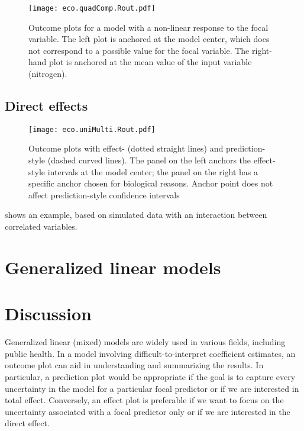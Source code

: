 \begin{figure}
\begin{center}
\texttt{[image: eco.quadComp.Rout.pdf]}
\end{center}
\caption{Outcome plots for a model with a non-linear response to the focal variable. The left plot is anchored at the model center, which does not correspond to a possible value for the focal variable. The right-hand plot is anchored at the mean value of the input variable (nitrogen). }
\end{figure}

\subsection{Direct effects}

\begin{figure}
\begin{center}
\texttt{[image: eco.uniMulti.Rout.pdf]}
\end{center}
\caption{Outcome plots with effect- (dotted straight lines) and prediction-style (dashed curved lines). The panel on the left anchors the effect-style intervals at the model center; the panel on the right has a specific anchor chosen for biological reasons. Anchor point does not affect prediction-style confidence intervals}
\end{figure}

 shows an example, based on simulated data with an interaction between correlated variables.

\section{Generalized linear models}

\section{Discussion}

Generalized linear (mixed) models are widely used in various fields, including public health. In a model involving difficult-to-interpret coefficient estimates, an outcome plot can aid in understanding and summarizing the results. In particular, a prediction plot would be appropriate if the goal is to capture every uncertainty in the model for a particular focal predictor or if we are interested in total effect. Conversely, an effect plot is preferable if we want to focus on the uncertainty associated with a focal predictor only or if we are interested in the direct effect.

